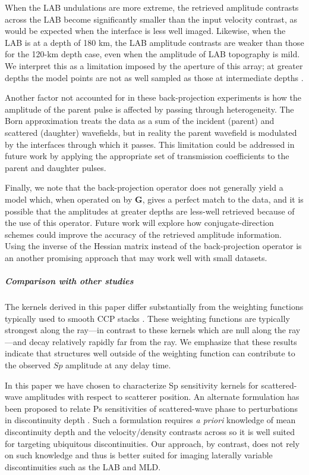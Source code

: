 \documentclass[referee]{gji}
\begin{document}
When the LAB undulations are more extreme, the retrieved amplitude contrasts across the LAB become significantly smaller than the input velocity contrast, as would be expected when the interface is less well imaged.  Likewise, when the LAB is at a depth of 180 km, the LAB amplitude contrasts are weaker than those for the 120-km depth case, even when the amplitude of LAB topography is mild.  We interpret this as a limitation imposed by the aperture of this array; at greater depths the model points are not as well sampled as those at intermediate depths \citep[c.f.,][]{Rondenay2005}.

Another factor not accounted for in these back-projection experiments is how the amplitude of the parent pulse is affected by passing through heterogeneity. The Born approximation treats the data as a sum of the incident (parent) and scattered (daughter) wavefields, but in reality the parent wavefield is modulated by the interfaces through which it passes.  This limitation could be addressed in future work by applying the appropriate set of transmission coefficients to the parent and daughter pulses.

Finally, we note that the back-projection operator does not generally yield a model which, when operated on by $\textbf{G}$, gives a perfect match to the data, and it is possible that the amplitudes at greater depths are less-well retrieved because of the use of this operator.  Future work will explore how conjugate-direction schemes could improve the accuracy of the retrieved amplitude information.  Using the inverse of the Hessian matrix instead of the back-projection operator is an another promising approach that may work well with small datasets.

\subparagraph{Comparison with other studies}
The kernels derived in this paper differ substantially from the weighting functions typically used to smooth CCP stacks \citep[e.g.,][]{Lekic2017}.  These weighting functions are typically strongest along the ray---in contrast to these kernels which are null along the ray---and decay relatively rapidly far from the ray. We emphasize that these results indicate that structures well outside of the weighting function can contribute to the observed $Sp$ amplitude at any delay time.

In this paper we have chosen to characterize Sp sensitivity kernels for scattered-wave amplitudes with respect to scatterer position.  An alternate formulation has been proposed to relate Ps sensitivities of scattered-wave phase to perturbations in discontinuity depth \citep{Deng2015}.  Such a formulation requires \emph{a priori} knowledge of mean discontinuity depth and the velocity/density contrasts across so it is well suited for targeting ubiquitous discontinuities.  Our approach, by contrast, does not rely on such knowledge and thus is better suited for imaging laterally variable discontinuities such as the LAB and MLD.
\end{document}
